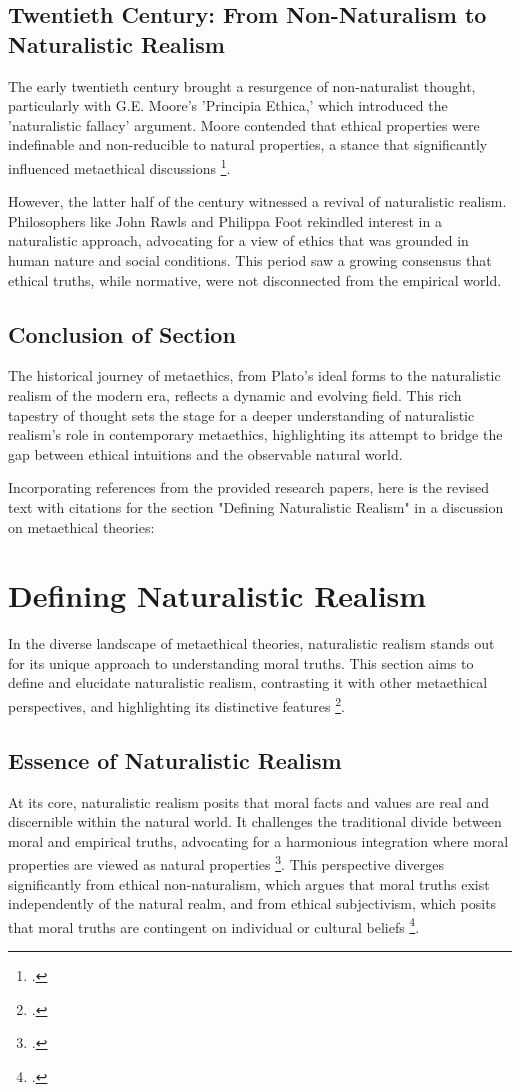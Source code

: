 \documentclass[12pt,a4paper]{article}
\begin{document}
\subsection{Twentieth Century: From Non-Naturalism to Naturalistic Realism}
The early twentieth century brought a resurgence of non-naturalist thought, particularly with G.E. Moore’s 'Principia Ethica,' which introduced the 'naturalistic fallacy' argument. Moore contended that ethical properties were indefinable and non-reducible to natural properties, a stance that significantly influenced metaethical discussions \footcite[291-311]{Baldwin2006}. 

However, the latter half of the century witnessed a revival of naturalistic realism. Philosophers like John Rawls and Philippa Foot rekindled interest in a naturalistic approach, advocating for a view of ethics that was grounded in human nature and social conditions. This period saw a growing consensus that ethical truths, while normative, were not disconnected from the empirical world.

\subsection{Conclusion of Section}
The historical journey of metaethics, from Plato's ideal forms to the naturalistic realism of the modern era, reflects a dynamic and evolving field. This rich tapestry of thought sets the stage for a deeper understanding of naturalistic realism's role in contemporary metaethics, highlighting its attempt to bridge the gap between ethical intuitions and the observable natural world.

Incorporating references from the provided research papers, here is the revised text with citations for the section "Defining Naturalistic Realism" in a discussion on metaethical theories:

\section{Defining Naturalistic Realism}

In the diverse landscape of metaethical theories, naturalistic realism stands out for its unique approach to understanding moral truths. This section aims to define and elucidate naturalistic realism, contrasting it with other metaethical perspectives, and highlighting its distinctive features \footcite[610-624]{Copp1991}.

\subsection{Essence of Naturalistic Realism}
At its core, naturalistic realism posits that moral facts and values are real and discernible within the natural world. It challenges the traditional divide between moral and empirical truths, advocating for a harmonious integration where moral properties are viewed as natural properties \footcite[532-547]{Dreier2018}. This perspective diverges significantly from ethical non-naturalism, which argues that moral truths exist independently of the natural realm, and from ethical subjectivism, which posits that moral truths are contingent on individual or cultural beliefs \footcite[843-851]{Joyce2014}.
\end{document}
